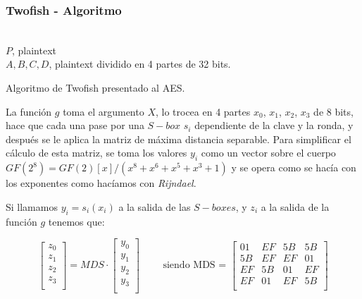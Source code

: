 \documentclass{beamer}
\begin{document}
	\begin{frame}
	\frametitle{Twofish - Algoritmo}
	\begin{algorithm}[H]
		\begin{algorithmic}[1]
			\REQUIRE \ \\
			\texttt{$P$}, plaintext\\
			\texttt{$A, B, C, D$}, plaintext dividido en 4 partes de 32 bits.\\
			
			
			\ENDFOR	
			
		\end{algorithmic}
		\caption{Algoritmo de Twofish presentado al AES.}
	\end{algorithm}

	La función $g$ toma el argumento $X$, lo trocea en 4 partes $x_0$, $x_1$, $x_2$, $x_3$ de 8 bits, hace que cada una pase por una $S-box$ $s_i$ dependiente de la clave y la ronda, y después se le aplica la matriz de máxima distancia separable. Para simplificar el cálculo de esta matriz, se toma los valores $y_i$ como un vector sobre el cuerpo $\textit{GF}(2^8) = \textit{GF}(2)[x]/(x^8+x^6+x^5+x^3+1)$ y se opera como se hacía con los exponentes como hacíamos con \textit{Rijndael}.
	
	Si llamamos $y_i = s_i (x_i)$ a la salida de las $S-boxes$, y $z_i$ a la salida de la función $g$ tenemos que:
	
	$$\begin{bmatrix}
	z_0 \\
	z_1 \\
	z_2 \\
	z_3 \\
	\end{bmatrix} =
	MDS \cdot
	\begin{bmatrix}
	y_0 \\
	y_1 \\
	y_2 \\
	y_3 \\
	\end{bmatrix} \qquad \text{ siendo MDS = }
	\begin{bmatrix}
	01 & EF & 5B & 5B \\
	5B & EF & EF & 01 \\
	EF & 5B & 01 & EF \\
	EF & 01 & EF & 5B \\
	\end{bmatrix}$$
	

\end{frame}
\end{document}

